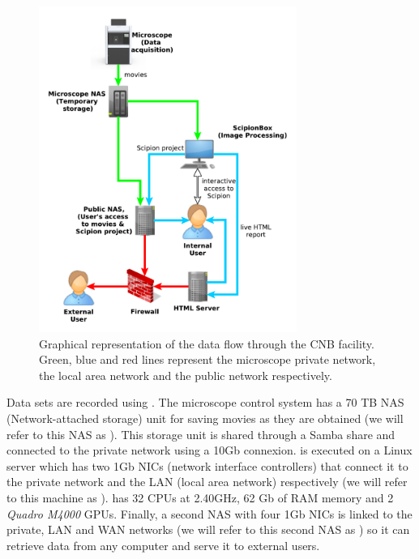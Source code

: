 \begin{figure}
  \centering
      \includegraphics[width=0.75\textwidth]{images/diagram.pdf}
  \caption{Graphical representation of the data flow through the CNB facility. Green, blue and red lines represent the microscope private network, the \cnb local area network and the public network respectively.}
  \label{fig:cnbpipeline}

\end{figure}


Data sets are recorded using \epu. The microscope control system has a 70 TB NAS (Network-attached storage) unit for saving movies as they are obtained (we will refer to this NAS as \mnas). This storage unit is shared through a Samba share and connected to the private network using a 10Gb connexion. \scipion is executed on a Linux server which has two 1Gb NICs (network interface controllers) that connect it to the private network and the LAN (local area network) respectively (we will refer to this machine as \scipionbox). \scipionbox has 32 CPUs at 2.40GHz, 62 Gb of RAM memory and 2 \textit{Quadro M4000} GPUs. Finally, a second NAS with four 1Gb NICs is linked to the private, LAN and WAN networks (we will refer to this second NAS as \onas) so it can retrieve data from any computer and serve it to external users.


